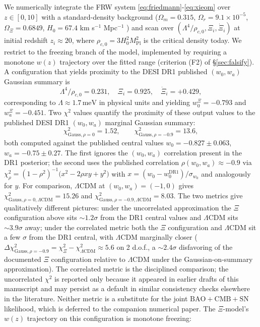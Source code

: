 \documentclass[11pt,reqno]{amsart}
\theoremstyle{plain}
\theoremstyle{definition}
\theoremstyle{remark}
\newcommand{\Pl}{\mathrm{Pl}}
\begin{document}
We numerically integrate the FRW system
\eqref{eq:friedmann}-\eqref{eq:xieom} over $z \in [0, 10]$ with a
standard-density background ($\Omega_m = 0.315$, $\Omega_r = 9.1\times10^{-5}$,
$\Omega_\Xi = 0.6849$, $H_0 = 67.4$ km s$^{-1}$ Mpc$^{-1}$
\cite{Planck2020}) and scan over $(\Lambda^{4}/\rho_{c,0}, \Xi_i, \dot\Xi_i)$
at initial redshift $z_i \approx 20$, where $\rho_{c,0} = 3 H_0^{2} M_\Pl^{2}$
is the critical density today. We restrict to the freezing branch of the
model, implemented by requiring a monotone $w(z)$ trajectory over the
fitted range (criterion (F2) of \S\ref{sec:falsify}). A configuration
that yields proximity to the DESI DR1 published $(w_0, w_a)$ Gaussian
summary is
\begin{equation}\label{eq:desibestfit}
  \Lambda^{4}/\rho_{c,0} = 0.231,
  \quad \Xi_i = 0.925,
  \quad \dot\Xi_i = +0.429,
\end{equation}
corresponding to $\Lambda \approx 1.7\,\text{meV}$ in physical units and
yielding $w_0^{\Xi} = -0.793$ and $w_a^{\Xi} = -0.451$. Two
$\chi^{2}$ values quantify the proximity of these output values to
the published DESI DR1 $(w_0, w_a)$ marginal Gaussian summary:
\[
  \chi^{2}_{\text{Gauss},\rho=0} = 1.52,\qquad
  \chi^{2}_{\text{Gauss},\rho=-0.9} = 13.6,
\]
both computed against the published central values $w_0 = -0.827 \pm
0.063$, $w_a = -0.75 \pm 0.27$. The first ignores the $(w_0, w_a)$
correlation present in the DR1 posterior; the second uses the
published correlation $\rho(w_0, w_a) \approx -0.9$ via
$\chi^{2}_{\rho} = (1-\rho^{2})^{-1}\bigl(x^{2}-2\rho x y + y^{2}\bigr)$
with $x=(w_0-w_0^{\text{DR1}})/\sigma_{w_0}$ and analogously for $y$.
For comparison, $\Lambda$CDM at $(w_0, w_a) = (-1, 0)$ gives
$\chi^{2}_{\text{Gauss},\rho=0,\Lambda\text{CDM}} = 15.26$ and
$\chi^{2}_{\text{Gauss},\rho=-0.9,\Lambda\text{CDM}} = 8.03$.
The two metrics give qualitatively different pictures: under the
uncorrelated approximation the $\Xi$ configuration above sits
$\sim 1.2\sigma$ from the DR1 central values and $\Lambda$CDM sits
$\sim 3.9\sigma$ away; under the correlated metric both the
$\Xi$ configuration and $\Lambda$CDM sit a few $\sigma$ from the
DR1 central, with $\Lambda$CDM marginally closer
($\Delta\chi^{2}_{\text{Gauss},\rho=-0.9}
= \chi^{2}_{\Xi} - \chi^{2}_{\Lambda\text{CDM}} \approx 5.6$ on
2 d.o.f., a $\sim 2.4\sigma$ disfavoring of the documented
$\Xi$ configuration relative to $\Lambda$CDM under the
Gaussian-on-summary approximation). The correlated
metric is the disciplined comparison; the uncorrelated $\chi^{2}$ is
reported only because it appeared in earlier drafts of this
manuscript and may persist as a default in similar consistency
checks elsewhere in the literature. Neither metric is a substitute
for the joint $\text{BAO} + \text{CMB} + \text{SN}$ likelihood,
which is deferred to the companion numerical paper. The
$\Xi$-model's $w(z)$ trajectory on this configuration is monotone
freezing:
\end{document}
